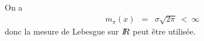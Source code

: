 \begin{rep} %
On a 
\begin{eqnarray*}
m_{\pi}(x) & = & \sigma \sqrt{2\pi} \ < \ \infty
\end{eqnarray*}
donc la mesure de Lebesgue sur $I\!\!R$ peut être utilisée.
\end{rep}